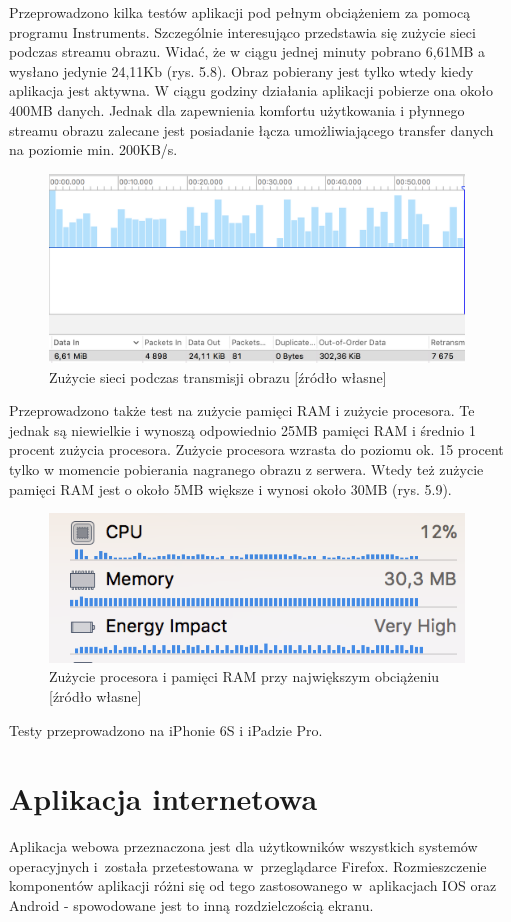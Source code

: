 Przeprowadzono kilka testów aplikacji pod pełnym obciążeniem za pomocą programu Instruments. Szczególnie interesująco przedstawia się zużycie sieci podczas streamu obrazu. Widać, że w ciągu jednej minuty pobrano 6,61MB a wysłano jedynie 24,11Kb (rys. 5.8). Obraz pobierany jest tylko wtedy kiedy aplikacja jest aktywna. W ciągu godziny działania aplikacji pobierze ona około 400MB danych. Jednak dla zapewnienia komfortu użytkowania i płynnego streamu obrazu zalecane jest posiadanie łącza umożliwiającego transfer danych na poziomie min. 200KB/s. 
\begin{figure}[ht]
	\centering
	\includegraphics[width=11cm]{ios_screenshots/networkUsage.png}
	\caption{Zużycie sieci podczas transmisji obrazu [źródło własne]}
\end{figure}
Przeprowadzono także test na zużycie pamięci RAM i zużycie procesora. Te jednak są niewielkie i wynoszą odpowiednio 25MB pamięci RAM i średnio 1 procent zużycia procesora.
Zużycie procesora wzrasta do poziomu ok. 15 procent tylko w momencie pobierania nagranego obrazu z serwera. Wtedy też zużycie pamięci RAM jest o około 5MB większe i wynosi około 30MB (rys. 5.9).
\begin{figure}[ht]
	\centering
	\includegraphics[width=11cm]{ios_screenshots/CPURAM.png}
	\caption{Zużycie procesora i pamięci RAM przy największym obciążeniu [źródło własne]}
\end{figure}
Testy przeprowadzono na iPhonie 6S i iPadzie Pro.


\section{Aplikacja internetowa}
Aplikacja webowa przeznaczona jest dla użytkowników wszystkich systemów operacyjnych i~została przetestowana w~przeglądarce Firefox. Rozmieszczenie komponentów aplikacji różni się od tego zastosowanego w~aplikacjach IOS oraz Android - spowodowane jest to inną rozdzielczością ekranu. 

